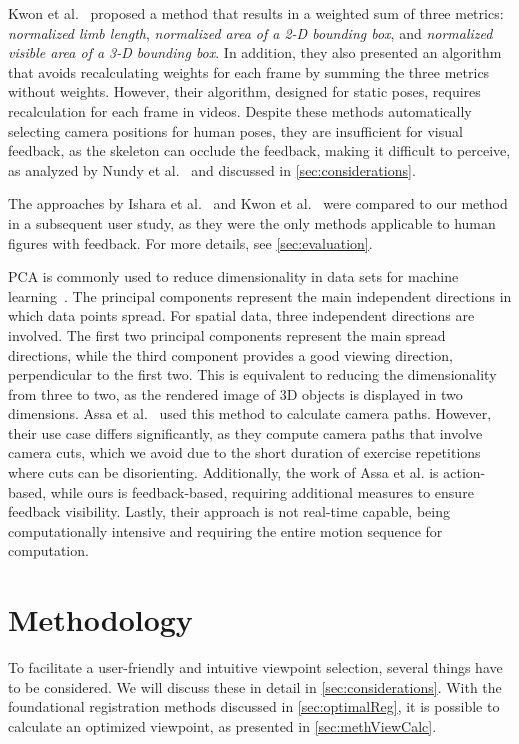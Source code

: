 Kwon et al.~\cite{kwon2020ocp} proposed a method that results in a weighted sum of three metrics: \emph{normalized limb length}, \emph{normalized area of a 2-D bounding box}, and \emph{normalized visible area of a 3-D bounding box}. In addition, they also presented an algorithm that avoids recalculating weights for each frame by summing the three metrics without weights. However, their algorithm, designed for static poses, requires recalculation for each frame in videos. Despite these methods automatically selecting camera positions for human poses, they are insufficient for visual feedback, as the skeleton can occlude the feedback, making it difficult to perceive, as analyzed by Nundy et al.~\cite{nundy2000wam} and discussed in \autoref{sec:considerations}.

The approaches by Ishara et al.~\cite{ishara2015mra} and Kwon et al.~\cite{kwon2020ocp} were compared to our method in a subsequent user study, as they were the only methods applicable to human figures with feedback. For more details, see \autoref{sec:evaluation}.

PCA is commonly used to reduce dimensionality in data sets for machine learning~\cite{sorzano2014sdr}. The principal components represent the main independent directions in which data points spread. For spatial data, three independent directions are involved. The first two principal components represent the main spread directions, while the third component provides a good viewing direction, perpendicular to the first two. This is equivalent to reducing the dimensionality from three to two, as the rendered image of 3D objects is displayed in two dimensions. Assa et al.~\cite{assa2008moh} used this method to calculate camera paths. However, their use case differs significantly, as they compute camera paths that involve camera cuts, which we avoid due to the short duration of exercise repetitions where cuts can be disorienting. Additionally, the work of Assa et al. is action-based, while ours is feedback-based, requiring additional measures to ensure feedback visibility. Lastly, their approach is not real-time capable, being computationally intensive and requiring the entire motion sequence for computation.

\section{Methodology \label{sec:view:methodology}}
To facilitate a user-friendly and intuitive viewpoint selection, several things have to be considered. We will discuss these in detail in \autoref{sec:considerations}. With the foundational registration methods discussed in \autoref{sec:optimalReg}, it is possible to calculate an optimized viewpoint, as presented in \autoref{sec:methViewCalc}.

